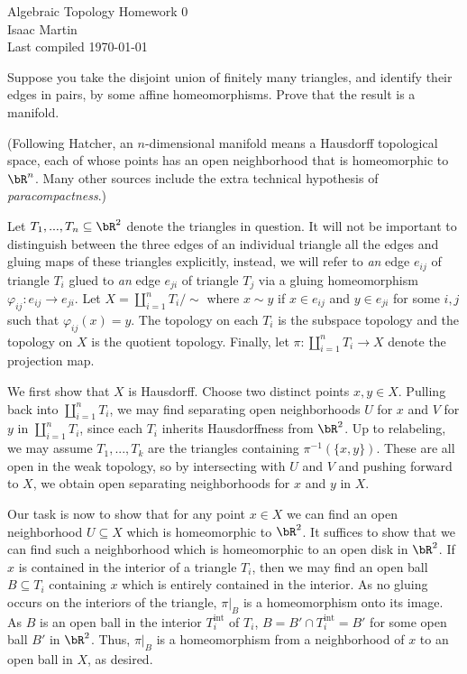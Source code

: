 

\def\sset{\subseteq}
\def\iso{\cong}
\def\gend#1{\langle #1\rangle}


\pagestyle{empty}
	\LARGE
\begin{center}
	Algebraic Topology Homework 0 \\
	\Large
	Isaac Martin \\
    Last compiled \today
\end{center}
\normalsize
\vspace{-2mm}
\hru
\begin{homework}[e]
    \prob Suppose you take the disjoint union of finitely many triangles, and identify their edges in pairs, by some affine homeomorphisms.  Prove that the result is a manifold.

    (Following Hatcher, an $n$-dimensional manifold means a Hausdorff topological space, each of whose points has an open neighborhood that is homeomorphic to $\bR^n$. Many other sources include the extra technical hypothesis of \emph{paracompactness}.)
	\begin{prf}
		Let $T_1,...,T_n \subseteq \bR^2$ denote the triangles in question. It will not be important to distinguish between the three edges of an individual triangle all the edges and gluing maps of these triangles explicitly, instead, we will refer to \emph{an} edge $e_{ij}$ of triangle $T_i$ glued to \emph{an} edge $e_{ji}$ of triangle $T_j$ via a gluing homeomorphism $\varphi_{ij}:e_{ij}\to e_{ji}$. Let $X = \coprod_{i = 1}^n T_i /\sim$ where $x \sim y$ if $x \in e_{ij}$ and $y \in e_{ji}$ for some $i,j$ such that $\varphi_{ij}(x) = y$. The topology on each $T_i$ is the subspace topology and the topology on $X$ is the quotient topology. Finally, let $\pi:\coprod_{i = 1}^n T_i \to X$ denote the projection map.

		We first show that $X$ is Hausdorff. Choose two distinct points $x,y \in X$. Pulling back into $\coprod_{i=1}^n T_i$, we may find separating open neighborhoods $U$ for $x$ and $V$ for $y$ in $\coprod_{i=1}^n T_i$, since each $T_i$ inherits Hausdorffness from $\bR^2$. Up to relabeling, we may assume $T_1,...,T_k$ are the triangles containing $\pi^{-1}(\{x,y\})$. These are all open in the weak topology, so by intersecting with $U$ and $V$ and pushing forward to $X$, we obtain open separating neighborhoods for $x$ and $y$ in $X$.

		Our task is now to show that for any point $x \in X$ we can find an open neighborhood $U \subseteq X$ which is homeomorphic to $\bR^2$. It suffices to show that we can find such a neighborhood which is homeomorphic to an open disk in $\bR^2$. If $x$ is contained in the interior of a triangle $T_i$, then we may find an open ball $B \subseteq T_i$ containing $x$ which is entirely contained in the interior. As no gluing occurs on the interiors of the triangle, $\pi|_B$ is a homeomorphism onto its image. As $B$ is an open ball in the interior $T_i^{\text{int}}$ of $T_i$, $B = B' \cap T^{\text{int}}_i = B'$ for some open ball $B'$ in $\bR^2$. Thus, $\pi|_B$ is a homeomorphism from a neighborhood of $x$ to an open ball in $X$, as desired.


\end{prf}
\end{homework}
